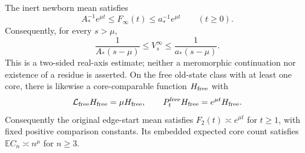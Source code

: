 \begin{corollary}
\label{cr:free-eigenfunction}
The inert newborn mean satisfies
\[
 A_*^{-1}e^{\mu t}\le F_\infty(t)\le a_*^{-1}e^{\mu t}
 \qquad(t\ge0).
\]
Consequently, for every $s>\mu$,
\begin{equation}
 \frac1{A_*(s-\mu)}\le V_s^\infty
 \le\frac1{a_*(s-\mu)}.
 \label{cr:real-pole-order}
\end{equation}
This is a two-sided real-axis estimate; neither a meromorphic
continuation nor existence of a residue is asserted.
On the free old-state class with at least one core, there is likewise
a core-comparable function $H_{\rm free}$ with
\[
 \mathcal L_{\rm free}H_{\rm free}=\mu H_{\rm free},
 \qquad P_t^{\rm free}H_{\rm free}=e^{\mu t}H_{\rm free}.
\]
Consequently the original edge-start mean satisfies
$F_2(t)\asymp e^{\mu t}$ for $t\ge1$, with fixed positive comparison
constants.  Its embedded expected core count satisfies
$\mathbb E C_n\asymp n^\mu$ for $n\ge3$.
\end{corollary}
